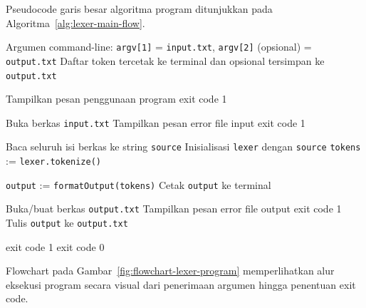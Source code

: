 Pseudocode garis besar algoritma program ditunjukkan pada Algoritma~\ref{alg:lexer-main-flow}.

\begin{breakablealgorithm}
    \label{alg:lexer-main-flow}
    \begin{algorithmic}[1]
        \Require Argumen command-line: \texttt{argv[1]} = \texttt{input.txt}, \texttt{argv[2]} (opsional) = \texttt{output.txt}
        \Ensure Daftar token tercetak ke terminal dan opsional tersimpan ke \texttt{output.txt}

        \State Tampilkan pesan penggunaan program
        \State \Return exit code 1
        \EndIf

        \State Buka berkas \texttt{input.txt}
        \State Tampilkan pesan error file input
        \State \Return exit code 1
        \EndIf

        \State Baca seluruh isi berkas ke string \texttt{source}
        \State Inisialisasi \texttt{lexer} dengan \texttt{source}
        \State \texttt{tokens} := \texttt{lexer.tokenize()}

        \State \texttt{output} := \texttt{formatOutput(tokens)}
        \State Cetak \texttt{output} ke terminal

        \State Buka/buat berkas \texttt{output.txt}
        \State Tampilkan pesan error file output
        \State \Return exit code 1
        \EndIf
        \State Tulis \texttt{output} ke \texttt{output.txt}
        \EndIf

        \State \Return exit code 1
        \Else
        \State \Return exit code 0
        \EndIf
    \end{algorithmic}
\end{breakablealgorithm}

Flowchart pada Gambar~\ref{fig:flowchart-lexer-program} memperlihatkan alur eksekusi program secara visual dari penerimaan argumen hingga penentuan exit code.


